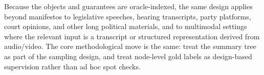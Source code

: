 \documentclass[11pt]{article}
\begin{document}
Because the objects and guarantees are oracle-indexed, the same design applies beyond manifestos to legislative speeches, hearing transcripts, party platforms, court opinions, and other long political materials, and to multimodal settings where the relevant input is a transcript or structured representation derived from audio/video. The core methodological move is the same: treat the summary tree as part of the sampling design, and treat node-level gold labels as design-based supervision rather than ad hoc spot checks.

\clearpage

{\small}
\end{document}
